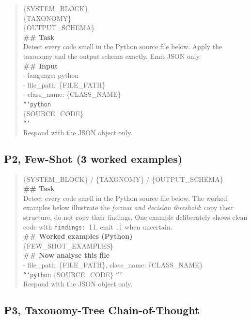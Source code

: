 \documentclass[conference]{IEEEtran}
\begin{document}
\begin{quote}\small\ttfamily
\{SYSTEM\_BLOCK\}\\
\{TAXONOMY\}\\
\{OUTPUT\_SCHEMA\}\\[0.3em]
\textbf{\#\# Task}\\
Detect every code smell in the Python source file below. Apply the
taxonomy and the output schema exactly. Emit JSON only.\\[0.3em]
\textbf{\#\# Input}\\
- language: python\\
- file\_path: \{FILE\_PATH\}\\
- class\_name: \{CLASS\_NAME\}\\[0.3em]
\texttt{```python}\\
\{SOURCE\_CODE\}\\
\texttt{```}\\[0.3em]
Respond with the JSON object only.
\end{quote}

\subsection{P2, Few-Shot (3 worked examples)}

\begin{quote}\small\ttfamily
\{SYSTEM\_BLOCK\} / \{TAXONOMY\} / \{OUTPUT\_SCHEMA\}\\[0.3em]
\textbf{\#\# Task}\\
Detect every code smell in the Python source file below. The worked
examples below illustrate the \textit{format and decision threshold}: copy
their structure, do not copy their findings. One example deliberately
shows clean code with \texttt{findings: []}, emit \texttt{[]} when
uncertain.\\[0.3em]
\textbf{\#\# Worked examples (Python)}\\
\{FEW\_SHOT\_EXAMPLES\}\\[0.3em]
\textbf{\#\# Now analyse this file}\\
- file\_path: \{FILE\_PATH\}, class\_name: \{CLASS\_NAME\}\\
\texttt{```python} \{SOURCE\_CODE\} \texttt{```}\\
Respond with the JSON object only.
\end{quote}

\subsection{P3, Taxonomy-Tree Chain-of-Thought}
\end{document}
